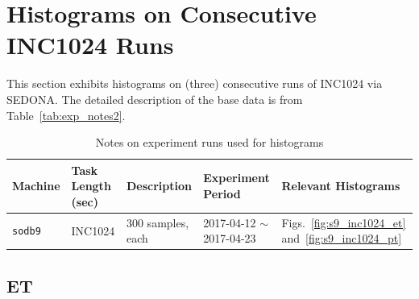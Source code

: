 \section{Histograms on Consecutive INC1024 Runs~\label{sec:s9_1024_runs}} 
This section exhibits histograms on (three) consecutive runs of INC1024 via SEDONA. 
The detailed description of the base data is from Table~\ref{tab:exp_notes2}.

\begin{table}[h]
\begin{center}
\begin{tabular}{|p{2cm}|p{3cm}|p{3cm}|p{4cm}|p{3.5cm}|} \hline
Machine & Task Length (sec) & Description & Experiment Period & Relevant \linebreak Histograms\\ \hline
{\tt sodb9} &  INC1024 & 300 samples, each & 2017-04-12 $\sim$ 2017-04-23 & 
Figs.~\ref{fig:s9_inc1024_et} and~\ref{fig:s9_inc1024_pt}\\ \hline
\end{tabular}
\end{center}
\vspace{-.2in}
\caption{Notes on experiment runs used for histograms\label{tab:inc1024_run_notes}}
\end{table}

\clearpage
\newpage

\subsection{ET}

